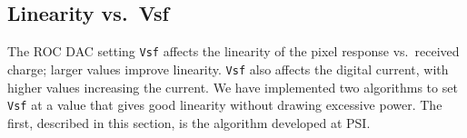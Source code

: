 






\subsection{Linearity vs.~Vsf}
\label{sec:LinearityVsVsf}

The ROC DAC setting \verb|Vsf| affects the linearity of the pixel response vs.~received charge; larger values improve linearity.  \verb|Vsf| also affects the digital current, with higher values increasing the current.  We have implemented two algorithms to set \verb|Vsf| at a value that gives good linearity without drawing excessive power.  The first, described in this section, is the algorithm developed at PSI.


